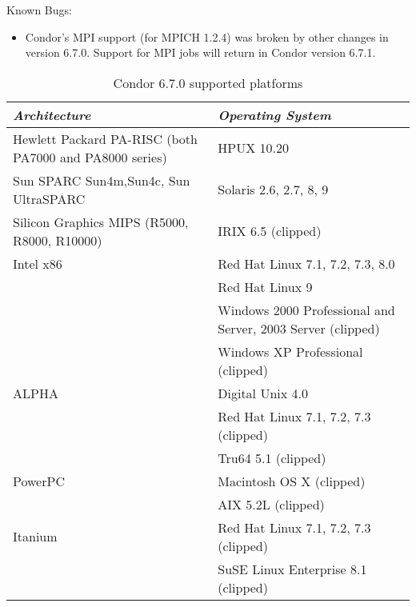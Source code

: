\noindent Known Bugs:

\begin{itemize}

\item Condor's MPI support (for MPICH 1.2.4) was broken by other
  changes in version 6.7.0.
  Support for MPI jobs will return in Condor version 6.7.1.

\end{itemize}
\begin{center}
\begin{table}[hbt]
\begin{tabular}{|ll|} \hline
\emph{Architecture} & \emph{Operating System} \\ \hline \hline
Hewlett Packard PA-RISC (both PA7000 and PA8000 series) & HPUX 10.20 \\ \hline
Sun SPARC Sun4m,Sun4c, Sun UltraSPARC & Solaris 2.6, 2.7, 8, 9 \\ \hline
Silicon Graphics MIPS (R5000, R8000, R10000) & IRIX 6.5 (clipped) \\ \hline
Intel x86 & Red Hat Linux 7.1, 7.2, 7.3, 8.0 \\
 & Red Hat Linux 9 \\
 & Windows 2000 Professional and Server, 2003 Server (clipped) \\
 & Windows XP Professional (clipped) \\ \hline
ALPHA & Digital Unix 4.0 \\
 & Red Hat Linux 7.1, 7.2, 7.3 (clipped) \\
 & Tru64 5.1 (clipped) \\ \hline
PowerPC & Macintosh OS X (clipped) \\
 & AIX 5.2L (clipped) \\ \hline
Itanium & Red Hat Linux 7.1, 7.2, 7.3 (clipped) \\
 & SuSE Linux Enterprise 8.1 (clipped) \\ \hline
\end{tabular}
\caption{\label{supported-platforms}Condor 6.7.0 supported platforms}
\end{table}
\end{center}
